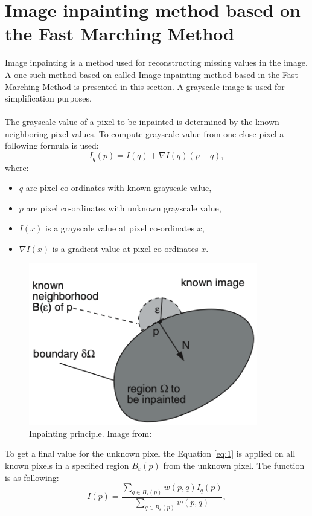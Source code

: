 \documentclass[twoside]{ctuthesis}
\theoremstyle{plain}
\theoremstyle{definition}
\theoremstyle{note}
\begin{document}
\section{Image inpainting method based on the Fast Marching Method} \label{inpainting}
Image inpainting is a method used for reconstructing missing values in the image. A one such method based on \cite{cite:5} called Image inpainting method based in the Fast Marching Method is presented in this section. A grayscale image is used for simplification purposes.\\
\\
The grayscale value of a pixel to be inpainted is determined by the known neighboring pixel values. To compute grayscale value from one close pixel a following formula is used:
\begin{equation} \label{eq:1}
	I_q(p)=I(q)+\nabla I(q)(p-q),
\end{equation}
where:
\begin{itemize}
	\item $q$ are pixel co-ordinates with known grayscale value,
	\item $p$ are pixel co-ordinates with unknown grayscale value,
	\item $I(x)$ is a grayscale value at pixel co-ordinates $x$,
	\item $\nabla I(x)$ is a gradient value at pixel co-ordinates $x$.
\end{itemize}
\begin{figure}[h]
	\centering
	\includegraphics[width=10cm]{inpaint_principle.png}
	\caption{Inpainting principle. Image from: \cite{cite:5}}
\end{figure}
To get a final value for the unknown pixel the Equation \ref{eq:1} is applied on all known pixels in a specified region $B_{\varepsilon}(p)$ from the unknown pixel. The function is as following:
\begin{equation}\label{inpaint_eq}
	I(p)=\frac{\sum_{q\in B_{\varepsilon}(p)}w(p,q)I_q(p)}{\sum_{q\in B_{\varepsilon}(p)}w(p,q)},
\end{equation}
\end{document}
